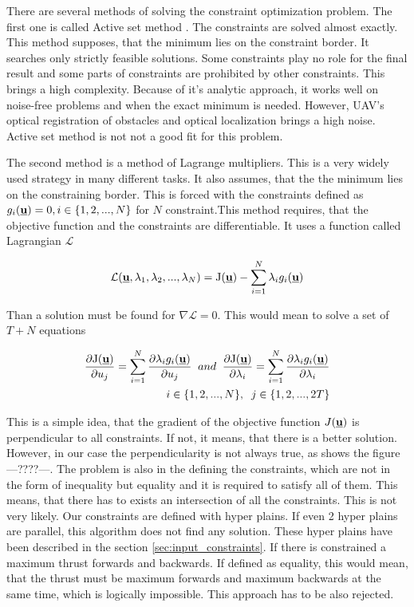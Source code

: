 \documentclass{article}
\newcommand{\Lagr}{\mathcal{L}}
\newcommand{\uvec}{\textbf{\underline{u}}}
\begin{document}
There are several methods of solving the constraint optimization problem.
The first one is called Active set method \cite{schittkowski1983convergence}. The constraints are solved almost exactly. This method supposes, that the minimum lies on the constraint border. It searches only strictly feasible solutions. Some constraints play no role for the final result and some parts of constraints are prohibited by other constraints. This brings a high complexity. Because of it's analytic approach, it works well on noise-free problems and when the exact minimum is needed. However, UAV's optical registration of obstacles and optical localization brings a high noise. Active set method is not not a good fit for this problem.

The second method is a method of Lagrange multipliers. This is a very widely used strategy in many different tasks. It also assumes, that the the minimum lies on the constraining border. This is forced with the constraints defined as $g_i(\uvec) = 0, i \in \{1, 2, ..., N\}$ for $N$ constraint.This method requires, that the objective function and the constraints are differentiable. It uses a function called Lagrangian $\Lagr$

\begin{equation}
\label{Lagrangian}
\Lagr(\uvec, \lambda_1, \lambda_2, ..., \lambda_N) = \mathrm{J}(\uvec) - \sum_{i = 1}^N \lambda_i g_i(\uvec)
\end{equation}

Than a solution must be found for $\nabla \Lagr = 0$. This would mean to solve a set of $T + N$ equations 

\begin{equation}
\label{Lagrangian}
\begin{split}
\frac{\partial \mathrm{J(\uvec)}}{\partial u_j} =  \sum_{i = 1}^N \frac{\partial \lambda_i g_i(\uvec) }{\partial u_j} \;\; and \;\;\frac{\partial \mathrm{J(\uvec)}}{\partial \lambda_i} =  \sum_{i = 1}^N \frac{\partial \lambda_i g_i(\uvec) }{\partial \lambda_i}\\
i \in \{1, 2, ..., N\},\;\;j \in \{1, 2, ..., 2T\}
\end{split}
\end{equation}

This is a simple idea, that the gradient of the objective function $J(\uvec)$ is perpendicular to all constraints. If not, it means, that there is a better solution. However, in our case the perpendicularity is not always true, as shows the figure ---????---. The problem is also in the defining the constraints, which are not in the form of inequality but equality and it is required to satisfy all of them. This means, that there has to exists an intersection of all the constraints. This is not very likely. Our constraints are defined with hyper plains. If even 2 hyper plains are parallel, this algorithm does not find any solution. These hyper plains have been described in the section \ref{sec:input_constraints}. If there is constrained a maximum thrust forwards and backwards. If defined as equality, this would mean, that the thrust must be maximum forwards and maximum backwards at the same time, which is logically impossible. This approach has to be also rejected.
\end{document}
